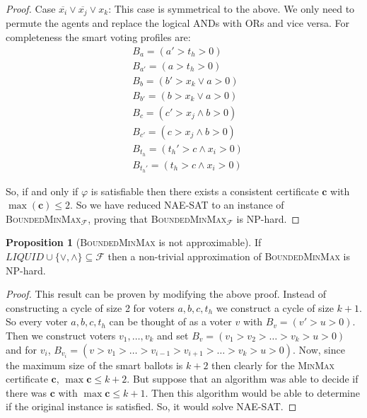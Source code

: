 \documentclass[11pt,a4paper, titlepage]{article}
\theoremstyle{definition}
\newtheorem{proposition}[theorem]{Proposition}
\let\vec\mathbf
\begin{document}
\begin{proof}
    Case $\overline{x_i} \lor \overline{x_j} \lor x_k$: This case is symmetrical to the above. We only need to permute the agents and replace the logical ANDs with ORs and vice versa. For completeness the smart voting profiles are:     \begin{align*}
        &B_a = (a' > t_h > 0) \\
        &B_{a'} = (a > t_h > 0) \\
        &B_{b} = (b' > x_k \lor a > 0) \\
        &B_{b'} = (b > x_k \lor a > 0) \\
        &B_{c} = (c' > x_j \land b > 0) \\
        &B_{c'} = (c > x_j \land b > 0) \\
        &B_{t_h} = (t_h' > c \land x_i > 0) \\
        &B_{t_h'} = (t_h > c \land x_i > 0)
    \end{align*}

    So, if and only if $\varphi$ is satisfiable then there exists a consistent certificate $\vec{c}$ with $\max(\vec{c}) \leq 2$. So we have reduced \textsc{NAE-SAT} to an instance of \textsc{BoundedMinMax}$_\mathcal{F}$, proving that \textsc{BoundedMinMax}$_\mathcal{F}$ is NP-hard.
\end{proof}



\begin{proposition}[\textsc{BoundedMinMax} is not approximable]
    If $\mathit{LIQUID} \cup \{\lor, \land\} \subseteq \mathcal{F}$ then a non-trivial approximation of \textsc{BoundedMinMax} is NP-hard.
\end{proposition}

\begin{proof}
    This result can be proven by modifying the above proof. Instead of constructing a cycle of size 2 for voters $a, b, c, t_h$ we construct a cycle of size $k + 1$. So every voter $a, b, c, t_h$ can be thought of as a voter $v$ with $B_v = (v' > u > 0)$. Then we construct voters $v_1, \ldots, v_k$ and set $B_v = (v_1 > v_2 > \ldots > v_k > u > 0)$ and for $v_i$, $B_{v_i} = (v > v_1 > \ldots > v_{i - 1} > v_{i+1} > \ldots > v_k > u > 0)$.
    Now, since the maximum size of the smart ballots is $k + 2$ then clearly for the \textsc{MinMax} certificate $\vec{c}$, $\max{\vec{c}} \leq k + 2$. 
    But suppose that an algorithm was able to decide if there was $\vec{c}$ with $\max{\vec{c}} \leq k + 1$. Then this algorithm would be able to determine if the original instance is satisfied. So, it would solve \textsc{NAE-SAT}.
\end{proof}
\end{document}
